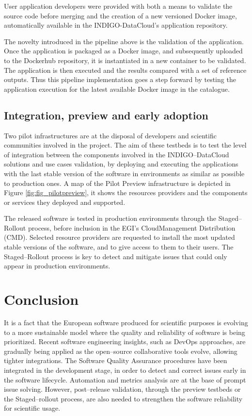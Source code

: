 \documentclass[journal]{IEEEtran}
\begin{document}
User application developers were provided with both a means to validate the
source code before merging and the creation of a new versioned Docker image,
automatically available in the INDIGO-DataCloud’s application repository.

The novelty introduced in the pipeline above is the validation of the application.
Once the application is packaged as a Docker image, and subsequently uploaded
to the Dockerhub repository, it is instantiated in a new container to be validated.
The application is then executed and the results compared with a set of reference outputs.
Thus this pipeline implementation goes a step forward by testing the application
execution for the latest available Docker image in the catalogue.


\subsection{Integration, preview and early adoption}

Two pilot infrastructures are at the disposal of developers and scientific
communities involved in the project. The aim of these testbeds is to test the
level of integration between the components involved in the INDIGO--DataCloud
solutions and use cases validation, by deploying and executing the applications
with the last stable version of the software in environments as similar as 
possible to production ones. A map of the Pilot Preview
infrastructure is depicted in Figure \ref{fig:fig_pilotpreview}, it shows the
resources providers and the components or services they deployed and supported.


The released software is tested in production environments through the
Staged--Rollout process, before inclusion in the EGI's CloudManagement Distribution (CMD). 
Selected resource providers are requested to install
the most updated stable versions of the software, and to give access to them to their users. The
Staged--Rollout process is key to detect and mitigate issues that could only
appear in production environments.

\section{Conclusion}
\label{sec:con}

It is a fact that the European software produced for scientific purposes is
evolving to a more sustainable model where the quality and reliability of
software is being prioritized. Recent software engineering insights, such as
DevOps approaches, are gradually being applied as the open--source collaborative tools
evolve, allowing tighter integrations. The Software Quality
Assurance procedures have been integrated in the development stage, in order to
detect and correct issues early in the software lifecycle. Automation and
metrics analysis are at the base of prompt issue solving. However, post--release
validation, through the preview testbeds or the Staged--rollout process, are
also needed to strengthen the software reliability for scientific usage.
\end{document}
